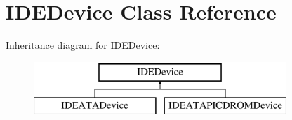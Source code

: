 \hypertarget{classIDEDevice}{\section{I\-D\-E\-Device Class Reference}
\label{classIDEDevice}
}
Inheritance diagram for I\-D\-E\-Device\-:\begin{figure}[H]
\begin{center}
\leavevmode
\includegraphics[height=2.000000cm]{classIDEDevice}
\end{center}
\end{figure}
